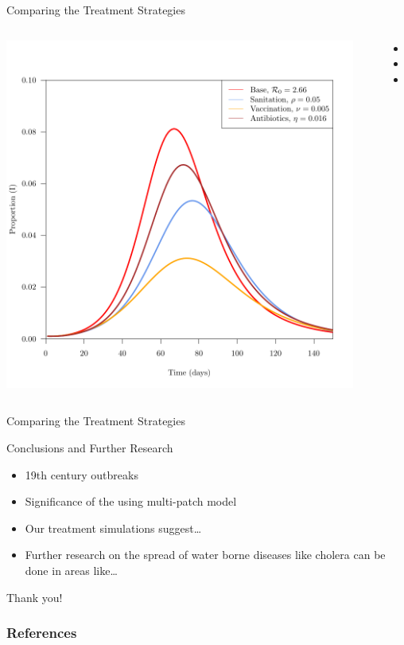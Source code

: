 \documentclass{beamer}\usepackage[]{graphicx}\usepackage[]{color}
\begin{document}
\begin{frame}{Comparing the Treatment Strategies}
\begin{columns}[onlytextwidth]
\includegraphics[width=0.95\textwidth]{images/treatcomparison.pdf}
\begin{itemize}
\setlength\itemsep{2em}
\item 
\item 
\item 
\end{itemize}
\end{columns}
\end{frame}

\begin{frame}{Comparing the Treatment Strategies}

\end{frame}

\begin{frame}{Conclusions and Further Research}
\begin{itemize}
\setlength\itemsep{2em}
\item 19th century outbreaks
\item Significance of the using multi-patch model
\item Our treatment simulations suggest…
\item Further research on the spread of water borne diseases like cholera can be done in areas like… 
\end{itemize}
\end{frame}

\begin{frame}
\begin{center}
{\huge Thank you!}
\end{center}
\end{frame}

\begin{frame}[allowframebreaks]
        \frametitle{References}
        \nocite{*}
        
        
\end{frame}
\end{document}
